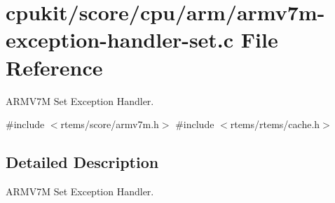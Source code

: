 \hypertarget{armv7m-exception-handler-set_8c}{}\section{cpukit/score/cpu/arm/armv7m-\/exception-\/handler-\/set.c File Reference}
\label{armv7m-exception-handler-set_8c}


A\+R\+M\+V7M Set Exception Handler.  


{\ttfamily \#include $<$rtems/score/armv7m.\+h$>$}\newline
{\ttfamily \#include $<$rtems/rtems/cache.\+h$>$}\newline


\subsection{Detailed Description}
A\+R\+M\+V7M Set Exception Handler. 


